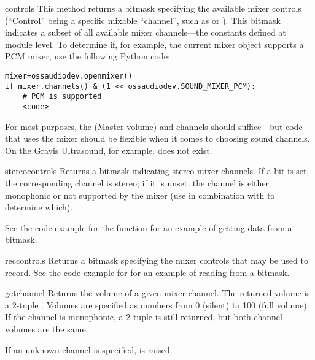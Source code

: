 \begin{methoddesc}{controls}{}
This method returns a bitmask specifying the available mixer controls
(``Control'' being a specific mixable ``channel'', such as
 or ).  This
bitmask indicates a subset of all available mixer channels---the
 constants defined at module level.  To determine if,
for example, the current mixer object supports a PCM mixer, use the
following Python code:

\begin{verbatim}
mixer=ossaudiodev.openmixer()
if mixer.channels() & (1 << ossaudiodev.SOUND_MIXER_PCM):
	# PCM is supported
	<code>
\end{verbatim}

For most purposes, the  (Master volume) and
 channels should suffice---but code that uses the
mixer should be flexible when it comes to choosing sound channels.  On
the Gravis Ultrasound, for example,  does not
exist.
\end{methoddesc}

\begin{methoddesc}{stereocontrols}{}
Returns a bitmask indicating stereo mixer channels.  If a bit is set,
the corresponding channel is stereo; if it is unset, the channel is
either monophonic or not supported by the mixer (use in combination with
 to determine which).

See the code example for the  function for an example
of getting data from a bitmask.
\end{methoddesc}

\begin{methoddesc}{reccontrols}{}
Returns a bitmask specifying the mixer controls that may be used to
record.  See the code example for  for an example of
reading from a bitmask.
\end{methoddesc}

\begin{methoddesc}{get}{channel}
Returns the volume of a given mixer channel.  The returned volume is a
2-tuple .  Volumes are specified as
numbers from 0 (silent) to 100 (full volume).  If the channel is
monophonic, a 2-tuple is still returned, but both channel volumes are
the same.

If an unknown channel is specified,  is raised.
\end{methoddesc}

